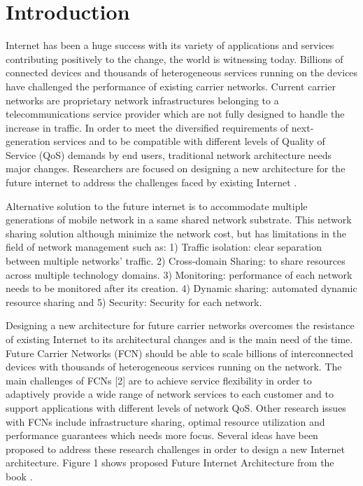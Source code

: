 \documentclass[article,dr=phil,type=msc ,colorback,accentcolor=tud4b]{tudthesis}
\begin{document}
    {}
  \author{Tejamurthy Shivakumar}
  \dateofexam{\today}{\today}
  \makethesistitle
  \setcounter{page}{0}
\tableofcontents


\newpage

 \section{Introduction}
 
Internet has been a huge success with its variety of applications and services contributing positively to the change, the world is witnessing today. Billions of connected devices and thousands of heterogeneous services running on the devices have challenged the performance of existing carrier networks. Current carrier networks are proprietary network infrastructures belonging to a telecommunications service provider which are not fully designed to handle the increase in traffic. In order to meet the diversified requirements of next-generation services and to be compatible with different levels of Quality of Service (QoS) demands by end users, traditional network architecture needs major changes. Researchers are focused on designing a new architecture for the future internet to address the challenges faced by existing Internet \cite{ 4086425}. \newline
 
 Alternative solution to the future internet is to accommodate multiple generations of mobile network in a same shared network substrate. This network sharing \cite{nw_sharing} solution although minimize the network cost, but has limitations in the field of network management such as: 1) Traffic isolation: clear separation between multiple networks' traffic. 2) Cross-domain Sharing: to share resources across multiple technology domains. 3) Monitoring: performance of each network needs to be monitored after its creation. 4) Dynamic sharing: automated dynamic resource sharing and 5) Security: Security for each network.\newline 
 
Designing a new architecture for future carrier networks overcomes the resistance of existing Internet to its architectural changes and is the main need of the time. Future Carrier Networks (FCN) should be able to scale billions of interconnected devices with thousands of heterogeneous services running on the network. The main challenges of FCNs [2] are to achieve service flexibility in order to adaptively provide a wide range of network services to each customer and to support applications with different levels of network QoS. Other research issues with FCNs include infrastructure sharing, optimal resource utilization and performance guarantees which needs more focus. Several ideas have been proposed to address these research challenges in order to design a new Internet architecture. Figure 1 shows proposed Future Internet Architecture from the book \cite{fcn_arc}. 
 
\end{document}
